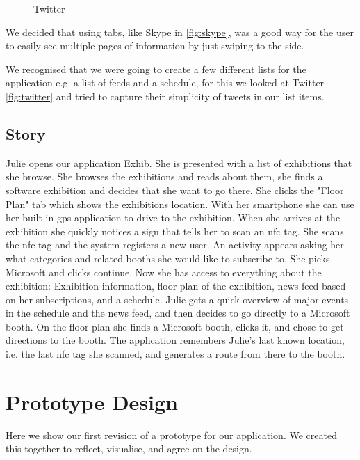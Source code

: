 \begin{figure}[H]
\begin{minipage}[b]{0.5\columnwidth}
\caption{Twitter\label{fig:twitter}}
\end{minipage}
\end{figure}

We decided that using tabs, like Skype in  \autoref{fig:skype}, was a good way for the user to easily see multiple pages of information by just swiping to the side.

We recognised that we were going to create a few different lists for the application e.g. a list of feeds and a schedule, for this we looked at Twitter \autoref{fig:twitter} and tried to capture their simplicity of tweets in our list items.

\subsection*{Story}
Julie opens our application Exhib. She is presented with a list of exhibitions that she browse. She browses the exhibitions and reads about them, she finds a software exhibition and decides that she want to go there. She clicks the "Floor Plan" tab which shows the exhibitions location. With her smartphone she can use her built-in \ac{gps} application to drive to the exhibition. When she arrives at the exhibition she quickly notices a sign that tells her to scan an \acs{nfc} tag. She scans the \acs{nfc} tag and the system registers a new user. An activity appears asking her what categories and related booths she would like to subscribe to. She picks Microsoft and clicks continue. Now she has access to everything about the exhibition: Exhibition information, floor plan of the exhibition, news feed based on her subscriptions, and a schedule. Julie gets a quick overview of major events in the schedule and the news feed, and then decides to go directly to a Microsoft booth. On the floor plan she finds a Microsoft booth, clicks it, and chose to get directions to the booth. The application remembers Julie's last known location, i.e. the last \acs{nfc} tag she scanned, and generates a route from there to the booth.

\section{Prototype Design}

Here we show our first revision of a prototype for our application. We created this together to reflect, visualise, and agree on the design.

